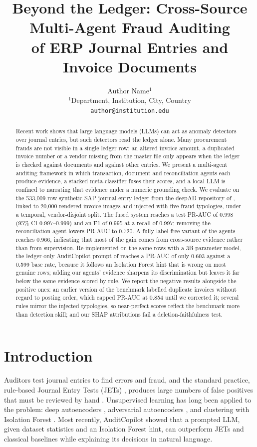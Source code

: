 \documentclass{article}
\title{Beyond the Ledger: Cross-Source Multi-Agent Fraud Auditing\\of ERP Journal Entries and Invoice Documents}
\author{%
  Author Name$^{1}$ \\
  $^{1}$Department, Institution, City, Country \\
  \texttt{author@institution.edu}
}
\begin{document}
\maketitle

\begin{abstract}
Recent work shows that large language models (LLMs) can act as anomaly detectors over journal entries, but such detectors read the ledger alone. Many procurement frauds are not visible in a single ledger row: an altered invoice amount, a duplicated invoice number or a vendor missing from the master file only appears when the ledger is checked against documents and against other entries. We present a multi-agent auditing framework in which transaction, document and reconciliation agents each produce evidence, a stacked meta-classifier fuses their scores, and a local LLM is confined to narrating that evidence under a numeric grounding check. We evaluate on the 533,009-row synthetic SAP journal-entry ledger from the deepAD repository of \citet{schreyer2017detection}, linked to 20,000 rendered invoice images and injected with five fraud typologies, under a temporal, vendor-disjoint split. The fused system reaches a test PR-AUC of 0.998 (95\% CI 0.997--0.999) and an F1 of 0.995 at a recall of 0.997; removing the reconciliation agent lowers PR-AUC to 0.720. A fully label-free variant of the agents reaches 0.966, indicating that most of the gain comes from cross-source evidence rather than from supervision. Re-implemented on the same rows with a 3B-parameter model, the ledger-only AuditCopilot prompt of \citet{kadir2025auditcopilot} reaches a PR-AUC of only 0.603 against a 0.599 base rate, because it follows an Isolation Forest hint that is wrong on most genuine rows; adding our agents' evidence sharpens its discrimination but leaves it far below the same evidence scored by rule. We report the negative results alongside the positive ones: an earlier version of the benchmark labelled duplicate invoices without regard to posting order, which capped PR-AUC at 0.854 until we corrected it; several rules mirror the injected typologies, so near-perfect scores reflect the benchmark more than detection skill; and our SHAP attributions fail a deletion-faithfulness test.
\end{abstract}

\section{Introduction}

Auditors test journal entries to find errors and fraud, and the standard practice, rule-based Journal Entry Tests (JETs) \citep{droste2024jet}, produces large numbers of false positives that must be reviewed by hand \citep{kadir2025auditcopilot}. Unsupervised learning has long been applied to the problem: deep autoencoders \citep{schreyer2017detection}, adversarial autoencoders \citep{schreyer2019adversarial}, and clustering with Isolation Forest \citep{herreros2025applied,gronewald2024anomaly}. Most recently, AuditCopilot \citep{kadir2025auditcopilot} showed that a prompted LLM, given dataset statistics and an Isolation Forest hint, can outperform JETs and classical baselines while explaining its decisions in natural language.
\end{document}
